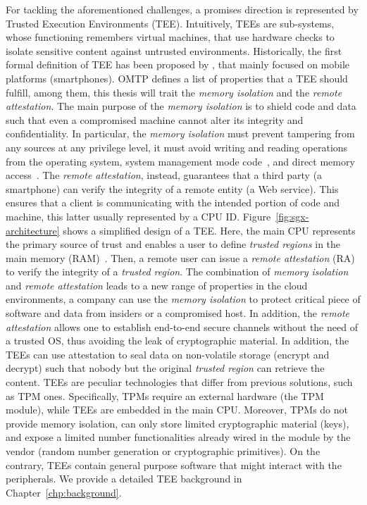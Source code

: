 For tackling the aforementioned challenges, a promises direction is 
represented by Trusted Execution Environments (TEE).
Intuitively, TEEs are sub-systems, whose functioning remembers virtual 
machines, that use hardware checks to isolate sensitive content against 
untrusted environments.
Historically, the first formal definition of TEE has been proposed by 
\cite{omtp}, that mainly focused on mobile platforms (\eg smartphones).
OMTP defines a list of properties that a TEE should fulfill, among them, this 
thesis will trait the \emph{memory isolation} and the \emph{remote attestation}.
The main purpose of the \emph{memory isolation} is to shield code and data such 
that even a compromised machine cannot alter its integrity and confidentiality.
In particular, the \emph{memory isolation} must prevent tampering from any 
sources at any privilege level, \eg it must avoid writing and reading 
operations from the operating system, system management mode 
code~\citep{yao2009system}, and direct memory 
access~\citep{coke1998implementing}.
The \emph{remote attestation}, instead, guarantees that a third party (\eg a 
smartphone) can verify the integrity of a remote entity (\eg a Web service).
This ensures that a client is communicating with the intended portion of code 
and machine, this latter usually represented by a CPU ID.
Figure~\ref{fig:sgx-architecture} shows a simplified design of a TEE.
Here, the main CPU represents the primary source of trust and enables a user to 
define \emph{trusted regions} in the main memory 
(RAM)~\citep{Sabt2015TrustedEE}.
Then, a remote user can issue a \emph{remote attestation} (RA) to verify the 
integrity of a \emph{trusted region}.
The combination of \emph{memory isolation} and \emph{remote attestation} leads 
to a new range of properties in the cloud environments, \ie a company 
can use the \emph{memory isolation} to protect critical piece of 
software and data from insiders or a compromised host.
In addition, the \emph{remote attestation} allows one to establish 
end-to-end secure channels without the need of a trusted OS, thus avoiding the 
leak of cryptographic material.
In addition, the TEEs can use attestation to seal data on non-volatile storage 
(\ie encrypt and decrypt) such that nobody but the original \emph{trusted 
region} can retrieve the content. 
TEEs are peculiar technologies that differ from previous solutions, such as TPM 
ones. Specifically, TPMs require an external hardware (\ie the TPM module), 
while TEEs are embedded in the main CPU.
Moreover, TPMs do not provide memory isolation, can only store limited 
cryptographic material (\eg keys), and expose a limited number functionalities 
already wired in the module by the vendor
(\eg random number generation or cryptographic primitives).
On the contrary, TEEs contain general purpose software that might 
interact with the peripherals.
We provide a detailed TEE background in Chapter~\ref{chp:background}.

